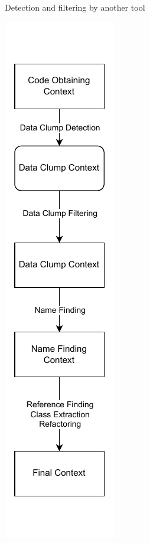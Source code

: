 \begin{figure}[H]
\begin{adjustbox}{minipage=\linewidth,scale=0.7}
\begin{subfigure}[b]{0.30\textwidth}
         \caption{Detection and filtering by another tool}
         \label{fig:context_pipeline2}
     \end{subfigure}
     \hfill
     \begin{subfigure}[b]{0.3\textwidth}
         \centering
         \includegraphics[width=\textwidth]{figures/chapter3/context_pipeline_3.drawio.pdf}

\end{subfigure}
\end{adjustbox}
\end{figure}

